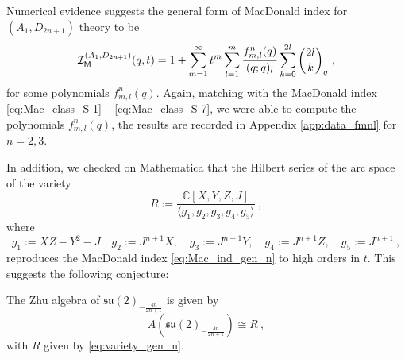 \documentclass[a4paper,10pt]{article}
\newcommand{\C}{\mathds{C}}
\newcommand{\mr}[1]{\mathsf{#1}}
\newcommand{\mf}[1]{\mathfrak{#1}}
\def\CI {{\cal I}}
\def\CI {{{\cal I}}}
\begin{document}
Numerical evidence suggests the general form of MacDonald index for $(A_1,D_{2n+1})$ theory to be
\begin{equation}\label{eq:Mac_A1D2n+1_conj}
\CI_{\mr{M}}^{(A_1,D_{2n+1})}(q,t)=1+\sum_{m=1}^\infty 
    t^m \sum_{l=1}^m
    \frac{f^n_{m,l}(q)}{(q;q)_l}\sum_{k=0}^{2l}\binom{2l}{k}_q~,    
\end{equation}
for some polynomials $f^n_{m,l}(q)$. Again, matching with the MacDonald index \eqref{eq:Mac_class_S-1} -- \eqref{eq:Mac_class_S-7}, we were able to compute the polynomials $f_{m,l}^n(q)$, the results are recorded in Appendix \ref{app:data_fmnl} for $n=2,3$. 
\par 
In addition, we checked on Mathematica that the Hilbert series of the arc space of the variety 
\begin{equation}\label{eq:variety_gen_n}
    R:=\frac{\C[X,Y,Z,J]}{\langle g_1,g_2,g_3,g_4,g_5\rangle}~,
\end{equation}
where 
\begin{equation}\label{eq:const_gen_n}
    g_1:=XZ-Y^2-J\quad g_2:=J^{n+1}X,\quad g_3:=J^{n+1}Y,\quad g_4:=J^{n+1}Z,\quad g_5:=J^{n+1}~,
\end{equation}
reproduces the MacDonald index \eqref{eq:Mac_ind_gen_n} to high orders in $t$. This suggests the following conjecture:
\begin{conj}
The Zhu algebra of $\mf{su}(2)_{-\frac{4n}{2n+1}}$ is given by 
\begin{equation}
    A\left(\mathfrak{su}(2)_{-\frac{4n}{2n+1}}\right)\cong R~,
\end{equation}
with $R$ given by \eqref{eq:variety_gen_n}.
\end{conj}
\end{document}
